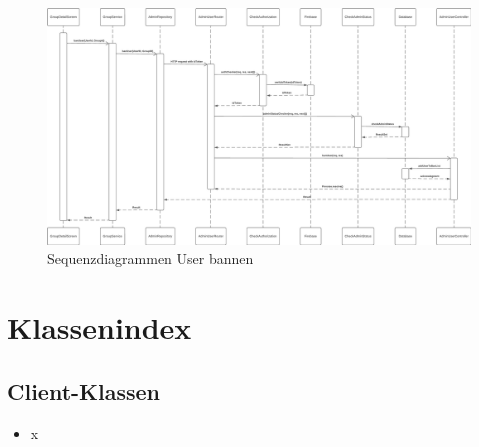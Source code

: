 \documentclass{entwurfsheft}
\begin{document}
        \begin{figure}[htp]
            \centering
            \includegraphics[width = \linewidth]{images/processDescription/SequenzdiagrammBanUser.pdf}
            \caption{Sequenzdiagrammen User bannen}
        \end{figure}

    \newpage 

\newpage
\section{Klassenindex}
\subsection{Client-Klassen}
\begin{multicols}{2}
    \begin{itemize}[label={}]
        \item x
    \end{itemize}
\end{multicols}
\end{document}
